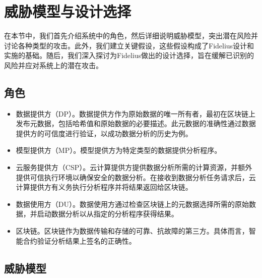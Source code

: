 \section{威胁模型与设计选择}

在本节中，我们首先介绍系统中的角色，然后详细说明威胁模型，突出潜在风险并讨论各种类型的攻击。此外，我们建立关键假设，这些假设构成了Fidelius设计和实施的基础。随后，我们深入探讨为Fidelius做出的设计选择，旨在缓解已识别的风险并应对系统上的潜在攻击。

\subsection{角色}
\begin{itemize}
    \item 数据提供方（DP）。数据提供方作为原始数据的唯一所有者，最初在区块链上发布元数据，包括哈希值和原始数据的必要描述。此元数据的准确性通过数据提供方的可信度进行验证，以成功数据分析的历史为例。
    \item 模型提供方（MP）。模型提供方为特定类型的数据提供分析程序。
    \item 云服务提供方（CSP）。云计算提供方提供数据分析所需的计算资源，并额外提供可信执行环境以确保安全的数据分析。在接收到数据分析任务请求后，云计算提供方有义务执行分析程序并将结果返回给区块链。
    \item 数据使用方（DU）。数据使用方通过检查区块链上的元数据选择所需的原始数据，并启动数据分析以从指定的分析程序获得结果。
    \item 区块链。区块链作为数据传输和存储的可靠、抗故障的第三方。具体而言，智能合约验证分析结果上签名的正确性。
\end{itemize}

\subsection{威胁模型}\label{subsec:threatmodel}


